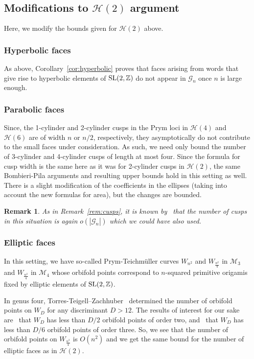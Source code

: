 \documentclass[a4paper,11pt]{amsart}
\numberwithin{equation}{section}
\numberwithin{figure}{section}
\numberwithin{table}{section}
\newtheorem{remark}[theorem]{Remark}
\newcommand{\teichmuller}{Teichm{\"u}ller }
\newcommand{\calH}{\mathcal{H}}
\newcommand{\Z}{\mathbb{Z}}
\DeclareMathOperator{\SL}{{\rm{SL}}}
\begin{document}

\subsection{Modifications to ${\calH(2)}$ argument}

Here, we modify the bounds given for $\calH(2)$ above.

\subsubsection{Hyperbolic faces} As above, Corollary~\ref{cor:hyperbolic} proves that faces arising from words that give rise to hyperbolic elements of $\SL(2,\Z)$ do not appear in $\mathcal{G}_{n}$ once $n$ is large enough.

\subsubsection{Parabolic faces} Since, the 1-cylinder and 2-cylinder cusps in the Prym loci in $\calH(4)$ and $\calH(6)$ are of width $n$ or $n/2$, respectively, they asymptotically do not contribute to the small faces under consideration. As such, we need only bound the number of 3-cylinder and 4-cylinder cusps of length at most four. Since the formula for cusp width is the same here as it was for 2-cylinder cusps in $\calH(2)$, the same Bombieri-Pila arguments and resulting upper bounds hold in this setting as well. There is a slight modification of the coefficients in the ellipses (taking into account the new formulas for area), but the changes are bounded.
\begin{remark}As in Remark~\ref{rem:cusps}, it is known by~\cite{LN14,LN20} that the number of cusps in this situation is again $o(|\mathcal{G}_{n}|)$ which we could have also used.
\end{remark}

\subsubsection{Elliptic faces} In this setting, we have so-called Prym-\teichmuller curves $W_{n^{2}}$ and $W_{\frac{n^2}{4}}$ in $\mathcal{M}_{3}$ and $W_{\frac{n^2}{4}}$ in $\mathcal{M}_{4}$ whose orbifold points correspond to $n$-squared primitive origamis fixed by elliptic elements of $\SL(2,\Z)$.

In genus four, Torres-Teigell--Zachhuber~\cite{TTZ19} determined the number of orbifold points on $W_{D}$ for any discriminant $D>12$. The results of interest for our sake are~\cite[Lemma 7.6]{TTZ19} that $W_{D}$ has less than $D/2$ orbifold points of order two, and~\cite[Lemma 7.7]{TTZ19} that $W_{D}$ has less than $D/6$ orbifold points of order three. So, we see that the number of orbifold points on $W_{\frac{n^{2}}{4}}$ is $O(n^2)$ and we get the same bound for the number of elliptic faces as in $\calH(2)$.
\end{document}
